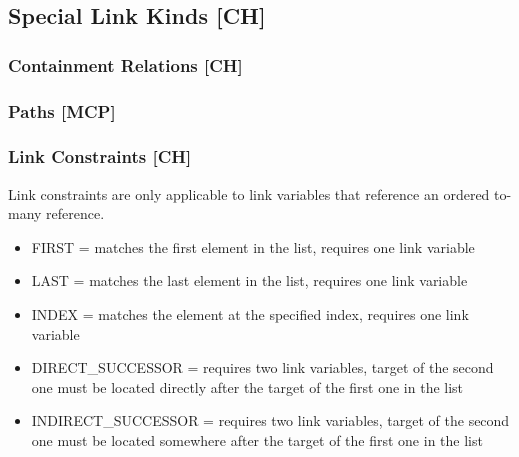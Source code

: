 \subsection{Special Link Kinds [CH]}

\subsubsection{Containment Relations [CH]}



\subsubsection{Paths [MCP]}

\subsubsection{Link Constraints [CH]}


Link constraints are only applicable to link variables that reference an ordered to-many reference. 
\begin{itemize}
  \item FIRST = matches the first element in the list, requires one link variable
  \item LAST = matches the last element in the list, requires one link variable
  \item INDEX = matches the element at the specified index, requires one link variable
  \item DIRECT\_SUCCESSOR = requires two link variables, target of the second one must be located directly after the target of the first one in the list
  \item INDIRECT\_SUCCESSOR = requires two link variables, target of the second one must be located somewhere after the target of the first one in the list
\end{itemize}


